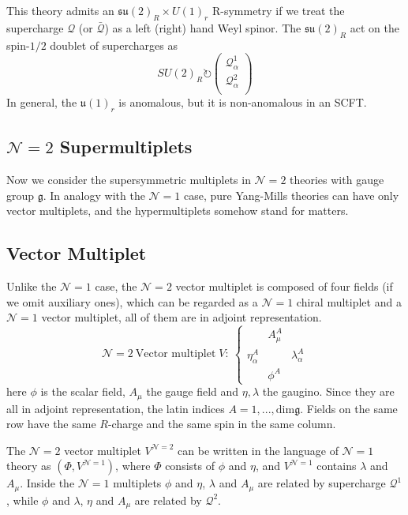 \documentclass{article}
\begin{document}
This theory admits an $\mathfrak{su}(2)_R\times U(1)_r$ R-symmetry if we treat the supercharge $\mathcal{Q}$ (or $\bar{\mathcal{Q}}$) as a left (right) hand Weyl spinor. The $\mathfrak{su}(2)_R$ act on the spin-$1/2$ doublet of supercharges as
\begin{equation}
SU(2)_R\circlearrowright\begin{pmatrix}
\mathcal{Q}^1_{\alpha}\\
\mathcal{Q}^2_{\alpha}\\\end{pmatrix}
\end{equation}
In general, the $\mathfrak{u}(1)_r$ is anomalous, but it is non-anomalous in an SCFT.

\subsection{$\mathcal{N}=2$ Supermultiplets}
Now we consider the supersymmetric multiplets in $\mathcal{N}=2$ theories with gauge group $\mathfrak{g}$. In analogy with the $\mathcal{N}=1$ case, pure Yang-Mills theories can have only vector multiplets, and the hypermultiplets somehow stand for matters.

\subsection{Vector Multiplet}
Unlike the $\mathcal{N}=1$ case, the $\mathcal{N}=2$ vector multiplet is composed of four fields (if we omit auxiliary ones), which can be regarded as a $\mathcal{N}=1$ chiral multiplet and a $\mathcal{N}=1$ vector multiplet, all of them are in adjoint representation.
\begin{equation}
\mathcal{N}=2\ \text{Vector multiplet}\;V :\ \left\{
\begin{matrix}
 &A^{A}_{\mu}& \\
\eta_{\alpha}^A& &\lambda_{\alpha}^A
\\&\phi^A& 
\end{matrix}
\right.
\end{equation}
here $\phi$ is the scalar field, $A_\mu$ the gauge field and $\eta,\lambda$ the gaugino. Since they are all in adjoint representation, the latin indices $A=1,...,\mathrm{dim}\mathfrak{g}$. Fields on the same row have the same $R$-charge and the same spin in the same column.

The $\mathcal{N}=2$ vector multiplet $V^{\mathcal{N}=2}$ can be written in the language of $\mathcal{N}=1$ theory as $(\Phi, V^{\mathcal{N}=1})$, where $\Phi$ consists of $\phi$ and $\eta$, and $ V^{\mathcal{N}=1}$ contains $\lambda$ and $A_\mu$. Inside the $\mathcal{N}=1$ multiplets $\phi$ and $\eta$, $\lambda$ and $A_\mu$ are related by supercharge $\mathcal{Q}^1$, while $\phi$ and $\lambda$, $\eta$ and $A_\mu$ are related by $\mathcal{Q}^2$. 
\end{document}
